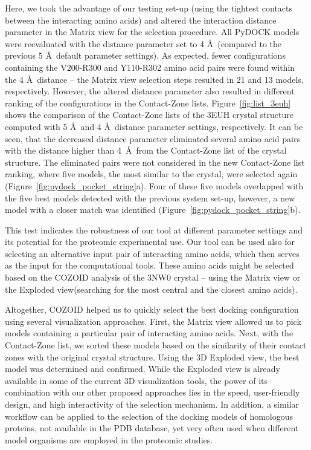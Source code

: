 \documentclass{bmcart}
\def\OpBook {Open-Book view\xspace}
\def\ExpView {Exploded view\xspace}
\def\MatView {Matrix view\xspace}
\def\CoZoList{Contact-Zone list\xspace}
\def\CoZoLists{Contact-Zone lists\xspace}
\begin{document}
Here, we took the advantage of our testing set-up (using the tightest contacts between the interacting amino acids) and altered the interaction distance parameter in the \MatView for the selection procedure. 
All PyDOCK models were reevaluated with the distance parameter set to 4 \AA~(compared to the previous 5 \AA~default parameter settings). 
As expected, fewer configurations containing the V200-R300 and Y110-R302 amino acid pairs were found within the 4 \AA~distance -- the \MatView selection steps resulted in 21 and 13 models, respectively.
However, the altered distance parameter also resulted in different ranking of the configurations in the \CoZoLists.
Figure~\ref{fig:list_3euh} shows the comparison of the \CoZoLists of the 3EUH crystal structure computed with 5 \AA~and 4 \AA~distance parameter settings, respectively.
It can be seen, that the decreased distance parameter eliminated several amino acid pairs with the distance higher than 4~\AA~from the \CoZoList of the crystal structure.
The eliminated pairs were not considered in the new \CoZoList ranking, where five models, the most similar to the crystal, were selected again (Figure~\ref{fig:pydock_pocket_string}a). 
Four of these five models overlapped with the five best models detected with the previous system set-up, however, a new model with a closer match was identified (Figure~\ref{fig:pydock_pocket_string}b).

This test indicates the robustness of our tool at different parameter settings and its potential for the proteomic experimental use.
Our tool can be used also for selecting an alternative input pair of interacting amino acids, which then serves as the input for the computational tools.
These amino acids might be selected based on the COZOID analysis of the 3NW0 crystal -- using the \MatView or the \ExpView (searching for the most central and the closest amino acids).

Altogether, COZOID helped us to quickly select the best docking configuration using several visualization approaches. 
First, the \MatView allowed us to pick models containing a particular pair of interacting amino acids. 
Next, with the \CoZoList, we sorted these models based on the similarity of their contact zones with the original crystal structure. 
Using the 3D \ExpView, the best model was determined and confirmed. 
While the Exploded view is already available in some of the current 3D visualization tools, the power of its combination with our other proposed approaches lies in the speed, user-friendly design, and high interactivity of the selection mechanism. 
In addition, a similar workflow can be applied to the selection of the docking models of homologous proteins, not available in the PDB database, yet very often used when different model organisms are employed in the proteomic studies.
 
\end{document}
